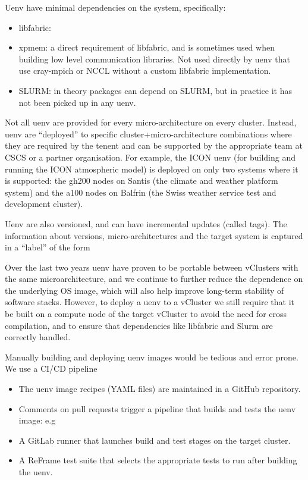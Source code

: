 Uenv have minimal dependencies on the system, specifically:
\begin{itemize}
    \item libfabric: 
    \item xpmem: a direct requirement of libfabric, and is sometimes used when building low level communication libraries.
        Not used directly by uenv that use cray-mpich or NCCL without a custom libfabric implementation.
    \item SLURM: in theory packages can depend on SLURM, but in practice it has not been picked up in any uenv.
\end{itemize}

Not all uenv are provided for every micro-architecture on every cluster.
Instead, uenv are ``deployed'' to specific cluster+micro-architecture combinations where they are required by the tenent and can be supported by the appropriate team at CSCS or a partner organisation.
For example, the ICON uenv (for building and running the ICON atmospheric model) is deployed on only two systems where it is supported: the gh200 nodes on Santis (the climate and weather platform system) and the a100 nodes on Balfrin (the Swiss weather service test and development cluster).

Uenv are also versioned, and can have incremental updates (called tags).
The information about versions, micro-architectures and the target system is captured in a ``label'' of the form 

Over the last two years uenv have proven to be portable between vClusters with the same microarchitecture, and we continue to further reduce the dependence on the underlying OS image, which will also help improve long-term stability of software stacks.
However, to deploy a uenv to a vCluster we still require that it be built on a compute node of the target vCluster to avoid the need for cross compilation, and to ensure that dependencies like libfabric and Slurm are correctly handled.

Manually building and deploying uenv images would be tedious and error prone.
We use a CI/CD pipeline 
\begin{itemize}
    \item The uenv image recipes (YAML files) are maintained in a GitHub repository.
    \item Comments on pull requests trigger a pipeline that builds and tests the uenv image: e.g 
    \item A GitLab runner that launches build and test stages on the target cluster.
    \item A ReFrame test suite that selects the appropriate tests to run after building the uenv.
\end{itemize}

